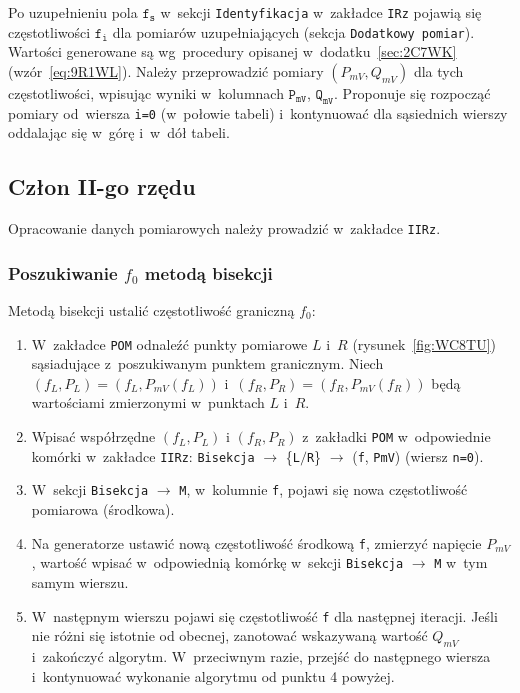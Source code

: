 \documentclass[paper=a4,DIV=12]{lpas}
\begin{document}
Po uzupełnieniu pola $\texttt{f}_\texttt{s}$ w~sekcji \texttt{Identyfikacja}
w~zakładce \texttt{IRz} pojawią się częstotliwości $\texttt{f}_\texttt{i}$
dla pomiarów uzupełniających (sekcja \texttt{Dodatkowy pomiar}). Wartości
generowane są wg~procedury opisanej w~dodatku~\ref{sec:2C7WK}
(wzór~\eqref{eq:9R1WL}). Należy przeprowadzić pomiary $(P_{mV}, Q_{mV})$ dla
tych częstotliwości, wpisując wyniki w~kolumnach $\texttt{P}_\texttt{mV}$,
$\texttt{Q}_\texttt{mV}$. Proponuje się rozpocząć pomiary od~wiersza
\texttt{i=0} (w~połowie tabeli) i~kontynuować dla sąsiednich wierszy oddalając
się w~górę i~w~dół tabeli.


\subsection{Człon II-go rzędu}
\label{sec:D53ZC}

Opracowanie danych pomiarowych należy prowadzić w~zakładce \texttt{IIRz}.

\subsubsection{Poszukiwanie \texorpdfstring{$f_0$}{f0} metodą bisekcji}
\label{sec:WM5KT}

Metodą bisekcji ustalić częstotliwość graniczną $f_0$:
\begin{enumerate}
  \item W~zakładce \texttt{POM} odnaleźć punkty pomiarowe $L$ i~$R$
    (rysunek~\ref{fig:WC8TU}) sąsiadujące z~poszukiwanym punktem granicznym.
    Niech $(f_L, P_L) = (f_L, P_{mV}(f_L))$ i~$(f_R, P_R) = (f_R, P_{mV}(f_R))$
    będą wartościami zmierzonymi w~punktach $L$ i~$R$.
  \item Wpisać współrzędne $(f_L, P_L)$ i $(f_R, P_R)$ z~zakładki
    \texttt{POM} w~odpowiednie komórki w~zakładce \texttt{IIRz}:
    \texttt{Bisekcja} $\rightarrow$ \{\texttt{L}$/$\texttt{R}\} $\rightarrow$
    (\texttt{f}, \texttt{PmV})  (wiersz \texttt{n=0}).
  \item W~sekcji \texttt{Bisekcja} $\rightarrow$ \texttt{M}, w~kolumnie
    \texttt{f}, pojawi się nowa częstotliwość pomiarowa (środkowa).
  \item Na generatorze ustawić nową częstotliwość środkową \texttt{f}, zmierzyć
    napięcie $P_{mV}$, wartość wpisać w~odpowiednią komórkę w~sekcji
    \texttt{Bisekcja} $\rightarrow$ \texttt{M} w~tym samym wierszu.
  \item W~następnym wierszu pojawi się częstotliwość \texttt{f} dla następnej
    iteracji. Jeśli nie różni się istotnie od obecnej, zanotować wskazywaną
    wartość $Q_{mV}$ i~zakończyć algorytm. W~przeciwnym razie, przejść do
    następnego wiersza i~kontynuować wykonanie algorytmu od punktu 4 powyżej.
\end{enumerate}
\end{document}
